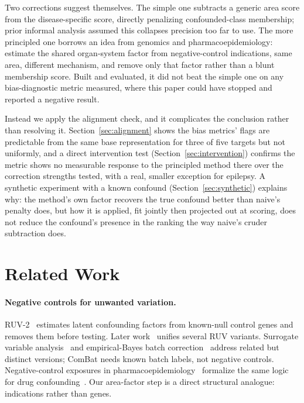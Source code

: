 \documentclass{llncs}
\begin{document}
Two corrections suggest themselves. The simple one subtracts a generic area score from the disease-specific score, directly penalizing confounded-class membership; prior informal analysis assumed this collapses precision too far to use. The more principled one borrows an idea from genomics and pharmacoepidemiology: estimate the shared organ-system factor from negative-control indications, same area, different mechanism, and remove only that factor rather than a blunt membership score. Built and evaluated, it did not beat the simple one on any bias-diagnostic metric measured, where this paper could have stopped and reported a negative result.

Instead we apply the alignment check, and it complicates the conclusion rather than resolving it. Section~\ref{sec:alignment} shows the bias metrics' flags are predictable from the same base representation for three of five targets but not uniformly, and a direct intervention test (Section~\ref{sec:intervention}) confirms the metric shows no measurable response to the principled method there over the correction strengths tested, with a real, smaller exception for epilepsy. A synthetic experiment with a known confound (Section~\ref{sec:synthetic}) explains why: the method's own factor recovers the true confound better than naive's penalty does, but how it is applied, fit jointly then projected out at scoring, does not reduce the confound's presence in the ranking the way naive's cruder subtraction does.

\section{Related Work}
\label{sec:related}

\paragraph{Negative controls for unwanted variation.}
RUV-2~\cite{gagnonbartsch2012ruv} estimates latent confounding factors from known-null control genes and removes them before testing. Later work~\cite{gerard2021ruvstar} unifies several RUV variants. Surrogate variable analysis~\cite{leek2007sva} and empirical-Bayes batch correction~\cite{johnson2007combat} address related but distinct versions; ComBat needs known batch labels, not negative controls. Negative-control exposures in pharmacoepidemiology~\cite{lipsitch2010negativecontrols} formalize the same logic for drug confounding~\cite{negctrlreview2023}. Our area-factor step is a direct structural analogue: indications rather than genes.
\end{document}
